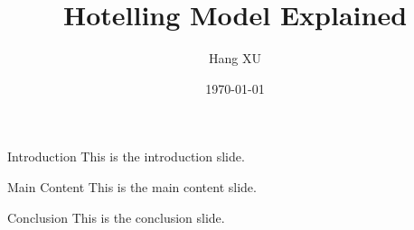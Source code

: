 \documentclass{beamer}
\title{Hotelling Model Explained}
\author{Hang XU}
\institute{Hong Kong University of Science and Technology}
\date{\today}
\begin{document}
\begin{frame}
    \titlepage
\end{frame}

\begin{frame}{Introduction}
    This is the introduction slide.
\end{frame}

\begin{frame}{Main Content}
    This is the main content slide.
\end{frame}

\begin{frame}{Conclusion}
    This is the conclusion slide.
\end{frame}
\end{document}
